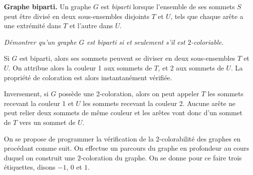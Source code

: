 \medskip

\textbf{Graphe biparti.} Un graphe $G$ est \emph{biparti} lorsque l'ensemble de ses sommets $S$ peut être divisé en deux sous-ensembles disjoints $T$ et $U$, tels que chaque arête a une extrémité dans $T$ et l'autre dans $U$. 
\begin{Exercise} \it
Démontrer qu'un graphe $G$ est biparti si et seulement s'il est $2$-coloriable. 
\end{Exercise}  
\begin{Answer}
Si $G$ est biparti, alors ses sommets peuvent se diviser en deux sous-ensembles $T$ et $U$. On attribue alors la couleur 1 aux sommets de $T$, et 2 aux sommets de $U$. La propriété de coloration est alors instantanément vérifiée.

Inversement, si $G$ possède une 2-coloration, alors on peut appeler $T$ les sommets recevant la couleur 1 et $U$ les sommets recevant la couleur 2. Aucune arête ne peut relier deux sommets de même couleur  et les arêtes vont donc d'un sommet de $T$ vers un sommet de $U$. 
\end{Answer}
On se propose de programmer la vérification de la $2$-colorabilité des graphes en procédant comme suit. On effectue un parcours du graphe en profondeur au cours duquel on construit une $2$-coloration du graphe. On se donne pour ce faire trois étiquettes, disons $-1$, $0$ et $1$. 

